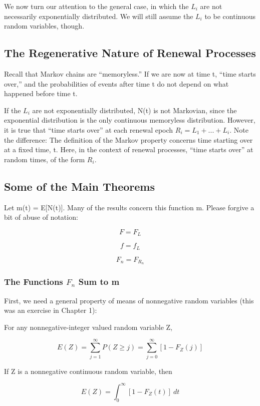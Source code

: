 We now turn our attention to the general case, in which the $L_{i}$ are
not necessarily exponentially distributed. We will still assume the $L_{i}$
to be continuous random variables, though.

\subsection{The Regenerative Nature of Renewal Processes}

Recall that Markov chains are ``memoryless.'' If we are now at time t, ``time
starts over,'' and the probabilities of events after time t do not depend on
what happened before time t.

If the $L_{i}$ are not exponentially distributed, N(t) is not
Markovian, since the exponential distribution is the only continuous
memoryless distribution.  However, it is true that ``time starts over'' at
each renewal epoch $R_i = L_1+...+L_i$.  Note the difference: The
definition of the Markov property concerns time starting over at a fixed
time, t. Here, in the context of renewal processes, ``time starts over''
at random times, of the form $R_i$.

\subsection{Some of the Main Theorems}

Let m(t) = E{[}N(t){]}. Many of the results concern this function m. 
Please forgive a bit of abuse of notation:

\begin{equation}
F = F_L
\end{equation}

\begin{equation}
f = f_L
\end{equation}

\begin{equation}
F_n = F_{R_n}
\end{equation}

\subsubsection{The Functions $F_n$ Sum to m}

First, we need a general property of means of nonnegative random
variables (this was an exercise in Chapter 1):

\begin{lemma}
\label{reverse}

For any nonnegative-integer valued random variable Z,

\begin{equation}
E(Z) = \sum ^{\infty }_{j=1}P(Z\geq j) 
= \sum ^{\infty }_{j=0} [1 - F_Z(j)]
\end{equation}

If Z is a nonnegative continuous random variable, then

\begin{equation}
E(Z) 
= \int ^{\infty }_{0} [1 - F_Z(t)] ~ dt
\end{equation}

\end{lemma}


